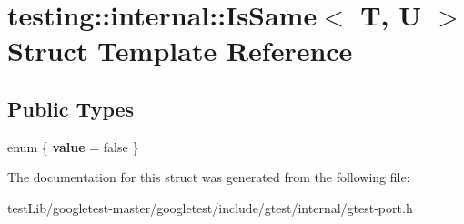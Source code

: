 \hypertarget{structtesting_1_1internal_1_1IsSame}{}\section{testing\+:\+:internal\+:\+:Is\+Same$<$ T, U $>$ Struct Template Reference}
\label{structtesting_1_1internal_1_1IsSame}
\subsection*{Public Types}
\begin{DoxyCompactItemize}
\item 
\mbox{\label{structtesting_1_1internal_1_1IsSame_a2cfeb9b5d672af954b14a257f26c67f4}} 
enum \{ {\bfseries value} = false
 \}
\end{DoxyCompactItemize}


The documentation for this struct was generated from the following file\+:\begin{DoxyCompactItemize}
\item 
test\+Lib/googletest-\/master/googletest/include/gtest/internal/gtest-\/port.\+h\end{DoxyCompactItemize}
